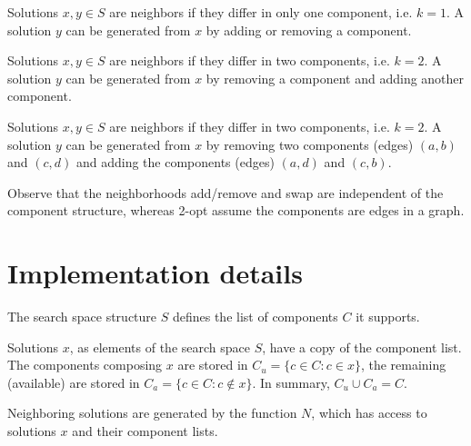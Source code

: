\documentclass[12pt,a4paper,onecolumn]{amsart}
\begin{document}
\begin{tcolorbox}
	\begin{example}
	Solutions $x,y\in S$ are neighbors if they differ in only one component, i.e. $k = 1$. A solution $y$ can be generated from $x$ by adding or removing a component.
	\end{example}
	
	\begin{example}
	Solutions $x,y\in S$ are neighbors if they differ in two components, i.e. $k = 2$. A solution $y$ can be generated from $x$ by removing a component and adding another component. 
	\end{example}
	
	\begin{example}
	Solutions $x,y\in S$ are neighbors if they differ in two components, i.e. $k = 2$. A solution $y$ can be generated from $x$ by removing two components (edges) $(a,b)$ and $(c,d)$ and adding the components (edges) $(a,d)$ and $(c,b)$.
	\end{example}
\end{tcolorbox}

Observe that the neighborhoods add/remove and swap are independent of the component structure, whereas 2-opt assume the components are edges in a graph.

\section{Implementation details}

\begin{definition}
The search space structure $S$ defines the list of components $C$ it supports.
\end{definition}


\begin{definition}[Solution]
Solutions $x$, as elements of the search space $S$, have a copy of the component list. The components composing $x$ are stored in $C_u = \{c\in C : c\in x\}$, the remaining (available) are stored in $C_a =\{ c\in C: c\notin x\}$. In summary, $C_u \cup C_a = C$.
\end{definition}

\begin{definition}[Neighborhood]
Neighboring solutions are generated by the function $N$, which has access to solutions $x$ and their component lists.
\end{definition}
\end{document}

